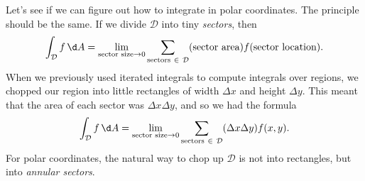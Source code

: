 Let's see if we can figure out how to integrate in polar coordinates.  The principle should be the same.
If we divide $\mathcal D$ into tiny \emph{sectors}, then
\[
	\int_{\mathcal D} f\,\d A =\lim_{\text{sector size}\to 0} \sum_{\text{sectors}\ \in\ \mathcal D} (\text{sector
	area})f(\text{sector location}).
\]
When we previously used iterated integrals to compute integrals over regions, we chopped 
our region into little rectangles of width $\Delta x$ and height $\Delta y$.  This meant
that the area of each sector was $\Delta x\Delta y$, and so we had the formula
\[
	\int_{\mathcal D} f\,\d A =\lim_{\text{sector size}\to 0} \sum_{\text{sectors}\ \in\ \mathcal D} 
	(\Delta x\Delta y) f(x,y).
\]
For polar coordinates, 
the natural way to chop up $\mathcal D$ is not into rectangles, but
into \emph{annular sectors}.

